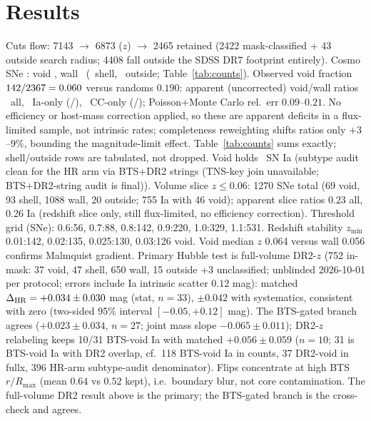 \section{Results}
Cuts flow: 7143 $\rightarrow$ 6873 ($z$) $\rightarrow$ 2465 retained (2422 mask-classified + 43 outside search radius; 4408 fall outside the SDSS DR7 footprint entirely). Cosmo SNe \NCosmo: void \NVoidCosmo, wall \NWallCosmo\ (\NShellCosmo\ shell, \NOutCosmo\ outside; Table~\ref{tab:counts}). Observed void fraction $142/2367=0.060$ versus randoms $0.190$: apparent (uncorrected) void/wall ratios \RRall\ all, \RRia\ Ia-only (\NIaVoid/\NIaWall), \RRcc\ CC-only (\NCCVoid/\NCCWall); Poisson+Monte Carlo rel.\ err $0.09$--$0.21$. No efficiency or host-mass correction applied, so these are apparent deficits in a flux-limited sample, not intrinsic rates; completeness reweighting shifts ratios only $+3$--$9\%$, bounding the magnitude-limit effect. Table~\ref{tab:counts} sums exactly; shell/outside rows are tabulated, not dropped. Void holds \NIaVoid\ SN Ia (subtype audit clean for the HR arm via BTS+DR2 strings (TNS-key join unavailable; BTS+DR2-string audit is final)). Volume slice $z\le0.06$: 1270 SNe total (69 void, 93 shell, 1088 wall, 20 outside; 755 Ia with 46 void); apparent slice ratios $0.23$ all, $0.26$ Ia (redshift slice only, still flux-limited, no efficiency correction). Threshold grid (SNe): 0.6:56, 0.7:88, 0.8:142, 0.9:220, 1.0:329, 1.1:531. Redshift stability $z_{\min}$ 0.01:142, 0.02:135, 0.025:130, 0.03:126 void. Void median $z$ 0.064 versus wall 0.056 confirms Malmquist gradient. Primary Hubble test is full-volume DR2-$z$ (752 in-mask: 37 void, 47 shell, 650 wall, 15 outside +3 unclassified; unblinded 2026-10-01 per protocol; errors include Ia intrinsic scatter $0.12$ mag): matched $\Delta_{\rm HR}=+0.034\pm0.030$ mag (stat, $n=33$), $\pm0.042$ with systematics, consistent with zero (two-sided 95\% interval $[-0.05,+0.12]$ mag). The BTS-gated branch agrees ($+0.023\pm0.034$, $n=27$; joint mass slope $-0.065\pm0.011$); DR2-$z$ relabeling keeps 10/31 BTS-void Ia with matched $+0.056\pm0.059$ ($n=10$; 31 is BTS-void Ia with DR2 overlap, cf.\ 118 BTS-void Ia in counts, 37 DR2-void in fullx, 396 HR-arm subtype-audit denominator). Flips concentrate at high BTS $r/R_{\max}$ (mean $0.64$ vs $0.52$ kept), i.e.\ boundary blur, not core contamination. The full-volume DR2 result above is the primary; the BTS-gated branch is the cross-check and agrees.





